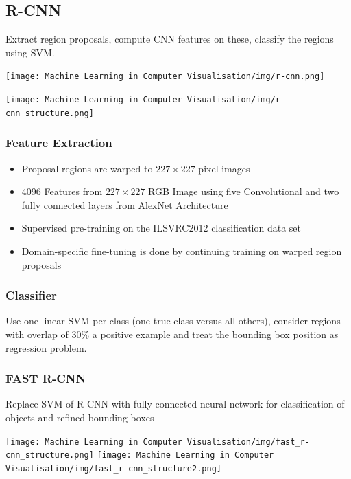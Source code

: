 \documentclass[x11names,11pt,a4paper]{article}
\theoremstyle{definition}
\begin{document}
\subsection{R-CNN}
Extract region proposals, compute CNN features on these, classify the regions using SVM.
\begin{center}
	\texttt{[image: Machine Learning in Computer Visualisation/img/r-cnn.png]}
\end{center}

\begin{center}
	\texttt{[image: Machine Learning in Computer Visualisation/img/r-cnn\_structure.png]}
\end{center}

\subsubsection{Feature Extraction}
\begin{itemize}
	\item Proposal regions are warped to $227\times 227$ pixel images
	\item 4096 Features from $227\times 227$ RGB Image using five Convolutional and two fully connected layers from AlexNet Architecture
	\item Supervised pre-training on the ILSVRC2012 classification data set
	\item Domain-specific fine-tuning is done by continuing training on warped region proposals
\end{itemize}

\subsubsection{Classifier}
Use one linear SVM per class (one true class versus all others), consider regions with overlap of 30\% a positive example and treat the bounding box position as regression problem.

\subsubsection{FAST R-CNN}
Replace SVM of R-CNN with fully connected neural network for classification of objects and refined bounding boxes
\begin{center}
	\texttt{[image: Machine Learning in Computer Visualisation/img/fast\_r-cnn\_structure.png]}
	\texttt{[image: Machine Learning in Computer Visualisation/img/fast\_r-cnn\_structure2.png]}
\end{center}
\end{document}
